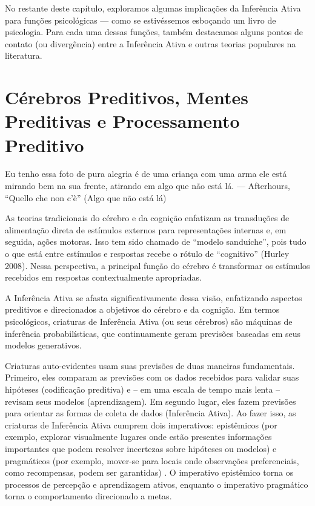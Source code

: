 \documentclass[
  12pt,
]{book}
\begin{document}
No restante deste capítulo, exploramos algumas implicações da Inferência Ativa para funções psicológicas --- como se estivéssemos esboçando um livro de psicologia. Para cada uma dessas funções, também destacamos alguns pontos de contato (ou divergência) entre a Inferência Ativa e outras teorias populares na literatura.

\hypertarget{cuxe9rebros-preditivos-mentes-preditivas-e-processamento-preditivo}{%
\section{Cérebros Preditivos, Mentes Preditivas e Processamento Preditivo}\label{cuxe9rebros-preditivos-mentes-preditivas-e-processamento-preditivo}}

Eu tenho essa foto de pura alegria
é de uma criança com uma arma
ele está mirando bem na sua frente,
atirando em algo que não está lá.
--- Afterhours, ``Quello che non c'è'' (Algo que não está lá)

As teorias tradicionais do cérebro e da cognição enfatizam as transduções de alimentação direta de estímulos externos para representações internas e, em seguida, ações motoras. Isso tem sido chamado de ``modelo sanduíche'', pois tudo o que está entre estímulos e respostas recebe o rótulo de ``cognitivo'' (Hurley 2008). Nessa perspectiva, a principal função do cérebro é transformar os estímulos recebidos em respostas contextualmente apropriadas.

A Inferência Ativa se afasta significativamente dessa visão, enfatizando aspectos preditivos e direcionados a objetivos do cérebro e da cognição. Em termos psicológicos, criaturas de Inferência Ativa (ou seus cérebros) são máquinas de inferência probabilísticas, que continuamente geram previsões baseadas em seus modelos generativos.

Criaturas auto-evidentes usam suas previsões de duas maneiras fundamentais. Primeiro, eles comparam as previsões com os dados recebidos para validar suas hipóteses (codificação preditiva) e -- em uma escala de tempo mais lenta -- revisam seus modelos (aprendizagem). Em segundo lugar, eles fazem previsões para orientar as formas de coleta de dados (Inferência Ativa). Ao fazer isso, as criaturas de Inferência Ativa cumprem dois imperativos: epistêmicos (por exemplo, explorar visualmente lugares onde estão presentes informações importantes que podem resolver incertezas sobre hipóteses ou modelos) e pragmáticos (por exemplo, mover-se para locais onde observações preferenciais, como recompensas, podem ser garantidas) . O imperativo epistêmico torna os processos de percepção e aprendizagem ativos, enquanto o imperativo pragmático torna o comportamento direcionado a metas.
\end{document}
